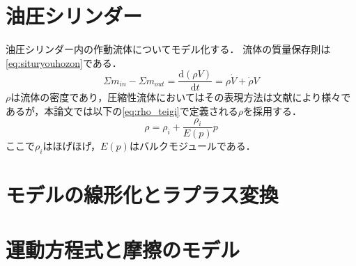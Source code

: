 \section{油圧シリンダー}
油圧シリンダー内の作動流体についてモデル化する．
流体の質量保存則は\eqnname\ref{eq:situryouhozon}である．
\begin{equation}
    \label{eq:situryouhozon}
    \Sigma m_{in}-\Sigma m_{out} = \frac{\mathrm{d}(\rho V)}{\mathrm{d}t} = \rho \dot{V}+\dot{\rho}V
\end{equation}
$\rho$は流体の密度であり，圧縮性流体においてはその表現方法は文献により様々であるが，本論文では以下の\eqnname\ref{eq:rho_teigi}で定義される$\rho$を採用する．
\begin{equation}
    \label{eq:rho_teigi}
    \rho = \rho_i + \frac{\rho_i}{E(p)}p
\end{equation}
ここで$\rho_i$はほげほげ，$E(p)$はバルクモジュールである．
\section{モデルの線形化とラプラス変換}

\section{運動方程式と摩擦のモデル}